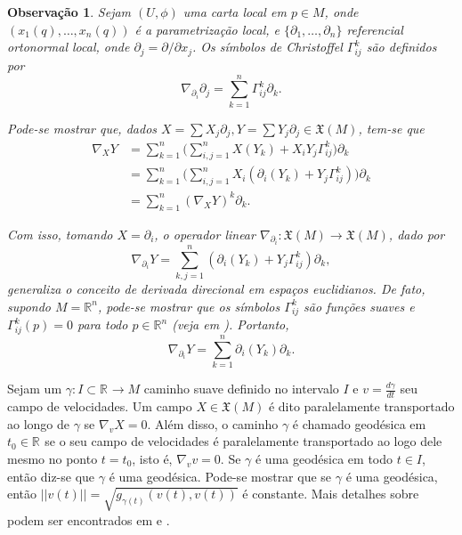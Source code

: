 \documentclass[12pt]{book}
\newtheorem{observacao}[teorema]{Observação}
\newcommand{\campossuaves}[1]{\mathfrak{X}(#1)}
\newcommand{\derivada}[2]{\frac{d #1}{d #2}}
\newcommand{\derivadaparcialabrev}[1]{\partial_{#1}}
\newcommand{\norma}[1]{||#1||}
\newcommand{\real}[1]{\mathbb{R}^{#1}}
\newcommand{\reta}{\real{}}
\begin{document}
	\begin{observacao}\label{observacao_conexao_afim}
		Sejam $(U, \phi)$ uma carta local em $p\in M$, onde $(x_{1}(q), \dots, x_{n}(q))$ é a parametrização local, e $\{\partial_{1}, \dots, \partial_{n}\}$ referencial ortonormal local, onde $\partial_{j} = \partial/\partial x_{j}$. Os símbolos de Christoffel $\Gamma^{k}_{ij}$ são definidos por
		$$
		\nabla_{\derivadaparcialabrev{i}}\derivadaparcialabrev{j} = \sum_{k=1}^{n}\Gamma^{k}_{ij}\derivadaparcialabrev{k}.
		$$
		
		Pode-se mostrar que, dados $X=\sum X_{j}\partial_{j}, Y=\sum Y_{j}\partial_{j} \in \campossuaves{M}$, tem-se que
		$$
		\begin{aligned}
		\nabla_{X}Y &= 
		\sum_{k=1}^{n} \Big( \sum_{i,j=1}^{n} X(Y_{k}) + X_{i}Y_{j} \Gamma^{k}_{ij}\Big)\partial_{k} 
		\\
		&= 
		\sum_{k=1}^{n} \Big( \sum_{i,j=1}^{n} X_{i} (\partial_{i}(Y_{k}) + Y_{j} \Gamma^{k}_{ij})\Big)\partial_{k} 
		\\
		&= \sum_{k=1}^{n} (\nabla_{X}Y)^{k}\partial_{k}.
		\end{aligned} 
		$$
		
		Com isso, tomando $X = \partial_{i}$, o operador linear $\nabla_{\partial_{i}}: \campossuaves{M} \to \campossuaves{M}$, dado por 
		$$
		\nabla_{\partial_{i}}Y = \sum_{k,j=1}^{n}  (\partial_{i}(Y_{k}) + Y_{j} \Gamma^{k}_{ij})\partial_{k},
		$$
		generaliza o conceito de derivada direcional em espaços euclidianos. De fato, supondo $M=\real{n}$, pode-se mostrar que os símbolos $\Gamma^{k}_{ij}$ são funções suaves e $\Gamma^{k}_{ij}(p)=0$ para todo $p \in \real{n}$ (veja em \cite{manfredo_riemannian_geo}). Portanto, 
		$$
		\nabla_{\partial_{i}}Y = \sum_{k=1}^{n}  \partial_{i}(Y_{k})\partial_{k}.
		$$
	\end{observacao}
	
	Sejam um $\gamma:I\subset\reta\to M$ caminho suave definido no intervalo $I$ e $v=\derivada{\gamma}{t}$ seu campo de velocidades. Um campo $X \in \campossuaves{M}$ é dito paralelamente transportado ao longo de $\gamma$ se $\nabla_{v}X=0$. Além disso, o caminho $\gamma$ é chamado geodésica em $t_{0} \in \reta$ se o seu campo de velocidades é paralelamente transportado ao logo dele mesmo no ponto $t=t_{0}$, isto é, $\nabla_{v}v=0$. Se $\gamma$ é uma geodésica em todo $t\in I$, então diz-se que $\gamma$ é uma geodésica. Pode-se mostrar que se $\gamma$ é uma geodésica, então $\norma{v(t)} = \sqrt{g_{\gamma(t)}(v(t), v(t))}$ é constante.
	Mais detalhes sobre podem ser encontrados em \cite{manfredo_riemannian_geo} e \cite{nakahara}.
	
\end{document}

